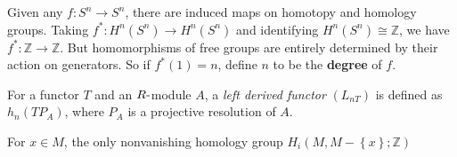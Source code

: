 \begin{definition}

Given any \(f: S^n \to S^n\), there are induced maps on homotopy and
homology groups. Taking \(f^*: H^n(S^n) \to H^n(S^n)\) and identifying
\(H^n(S^n) \cong {\mathbb{Z}}\), we have
\(f^*: {\mathbb{Z}}\to{\mathbb{Z}}\). But homomorphisms of free groups
are entirely determined by their action on generators. So if
\(f^*(1) = n\), define \(n\) to be the \textbf{degree} of \(f\).

\end{definition}

\begin{definition}

For a functor \(T\) and an \(R{\hbox{-}}\)module \(A\), a \emph{left
derived functor} \((L_{nT})\) is defined as \(h_{n}(TP_{A})\), where
\(P_{A}\) is a projective resolution of \(A\).

\end{definition}

\begin{definition}

For \(x\in M\), the only nonvanishing homology group
\(H_{i}(M, M - \left\{{x}\right\}; {\mathbb{Z}})\)

\end{definition}

\begin{definition}

\end{definition}


\begin{definition}

\end{definition}


\begin{definition}

\end{definition}


\begin{definition}

\end{definition}


\begin{definition}

\end{definition}

